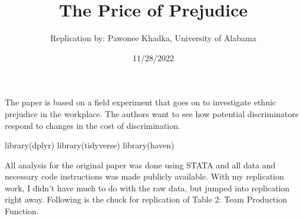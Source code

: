 \documentclass[
]{article}
\title{The Price of Prejudice}
\author{Replication by: Pawonee Khadka, University of Alabama}
\date{11/28/2022}
\newenvironment{Shaded}{\begin{snugshade}}{\end{snugshade}}
\newcommand{\FunctionTok}[1]{\textcolor[rgb]{0.00,0.00,0.00}{#1}}
\newcommand{\NormalTok}[1]{#1}
\begin{document}
\maketitle

The paper is based on a field experiment that goes on to investigate
ethnic prejudice in the workplace. The authors want to see how potential
discriminators respond to changes in the cost of discrimination.

\begin{Shaded}
\begin{Highlighting}[]
\FunctionTok{library}\NormalTok{(dplyr)}
\FunctionTok{library}\NormalTok{(tidyverse)}
\FunctionTok{library}\NormalTok{(haven)}
\end{Highlighting}
\end{Shaded}

All analysis for the original paper was done using STATA and all data
and necessary code instructions was made publicly available. With my
replication work, I didn't have much to do with the raw data, but jumped
into replication right away. Following is the chuck for replication of
Table 2: Team Production Function.
\end{document}
